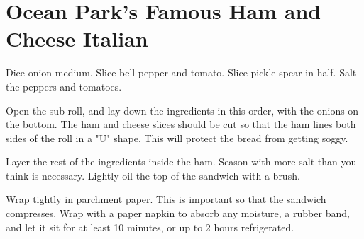 \section{Ocean Park's Famous Ham and Cheese Italian}
\begin{recipe}



Dice onion medium. Slice bell pepper and tomato. 
Slice pickle spear in half. Salt the peppers and tomatoes. 


Open the sub roll, and lay down the ingredients in this order, with the onions on the bottom.
The ham and cheese slices should be cut so that the ham lines both sides of the roll in a "U" shape.
This will protect the bread from getting soggy.

Layer the rest of the ingredients inside the ham. Season with more salt than you think is necessary. 
Lightly oil the top of the sandwich with a brush. 

Wrap tightly in parchment paper. This is important so that the sandwich compresses. Wrap with a paper napkin to absorb any moisture, a rubber
band, and let it sit for at least 10 minutes, or up to 2 hours refrigerated. 

\end{recipe}
